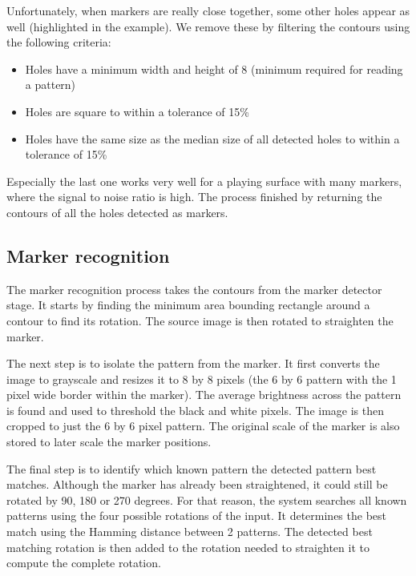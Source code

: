             Unfortunately, when markers are really close together, some other
            holes appear as well (highlighted in the example). We remove these
            by filtering the contours using the following criteria:

            \begin{itemize}
                \item Holes have a minimum width and height of 8 (minimum
                required for reading a pattern)
                \item Holes are square to within a tolerance of 15\%
                \item Holes have the same size as the median size of all
                detected holes to within a tolerance of 15\%
            \end{itemize}

            Especially the last one works very well for a playing surface with
            many markers, where the signal to noise ratio is high. The process
            finished by returning the contours of all the holes detected as
            markers.

        \subsection{Marker recognition}
            The marker recognition process takes the contours from the marker
            detector stage. It starts by finding the minimum area bounding
            rectangle around a contour to find its rotation. The source image is
            then rotated to straighten the marker.

            The next step is to isolate the pattern from the marker. It first
            converts the image to grayscale and resizes it to 8 by 8 pixels (the
            6 by 6 pattern with the 1 pixel wide border within the marker). The
            average brightness across the pattern is found and used to threshold
            the black and white pixels. The image is then cropped to just the 6
            by 6 pixel pattern. The original scale of the marker is also stored
            to later scale the marker positions.

            The final step is to identify which known pattern the detected
            pattern best matches. Although the marker has already been
            straightened, it could still be rotated by 90, 180 or 270 degrees.
            For that reason, the system searches all known patterns using the
            four possible rotations of the input. It determines the best match
            using the Hamming distance between 2 patterns. The detected best
            matching rotation is then added to the rotation needed to straighten
            it to compute the complete rotation.

